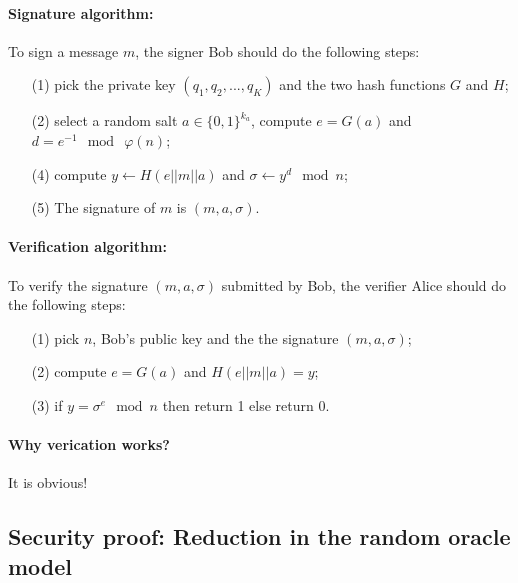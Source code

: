 \documentclass[a4paper,11pt]{article}
\begin{document}
\paragraph{Signature algorithm:}


\label{signature1} To sign a message $m$, the signer Bob should do
the following steps:
\begin{itemize}
\item[\rm(1)]    pick the private key $(q_1,q_2,...,q_K)$ and the two hash functions $G$ and $H$;

\item[\rm(2)]    select a random salt $a\in \{0,1\}^{k_a}$, compute $e=G(a)$ and $d=e^{-1} \mod \ \varphi(n)$;

\item[\rm(4)]   compute    $y\longleftarrow H(e||m||a)$ and $\sigma\longleftarrow y^d \mod n$;

\item[\rm(5)]   The signature of $m$ is   $(m,a,\sigma)$.
\end{itemize}

 \vspace{0.2cm}

\paragraph{Verification algorithm:}

\label{verification1}

 To verify the signature $(m,a,\sigma)$ submitted by Bob, the verifier Alice should do the following steps:

\begin{itemize}
\item[\rm(1)]   pick $n$, Bob's public key and the the signature $(m,a,\sigma) $;
\item [\rm(2)]compute $e=G(a)$ and $H(e||m||a)=y$;

\item[\rm(3)] if $y=\sigma^e \mod n$ then return 1 else return 0.

\end{itemize}


\paragraph{Why verication works?}  It is obvious!

\subsection{Security proof: Reduction in the random oracle model}\label{sec:three:2}
\end{document}
